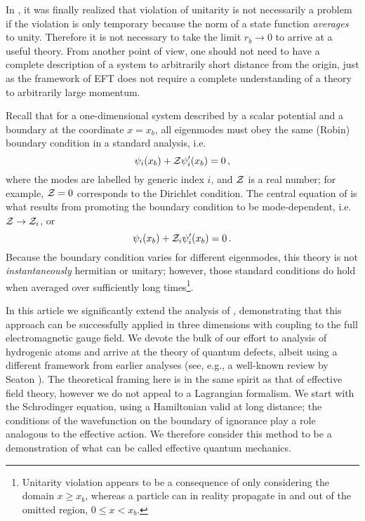 \documentclass[pra,twocolumn,nofootinbib, superscriptaddress]{revtex4}%
\begin{document}
In \cite{Jacobs:2019woc}, it was finally realized that violation of unitarity is not necessarily a problem if the violation is only temporary because the norm of a state function \emph{averages} to unity. Therefore it is not necessary to take the limit $r_b\to 0$ to arrive at a useful theory. From another point of view, one should not need to have a complete description of a system to arbitrarily short distance from the origin, just as the framework of EFT does not require a complete understanding of a theory to arbitrarily large momentum.

  Recall that for a one-dimensional system described by a scalar potential and a boundary at the coordinate $x=x_b$, all eigenmodes must obey the same (Robin) boundary condition in a standard analysis, i.e.
\begin{equation}
\psi_i(x_b)+{\cal Z} \psi_i'(x_b)=0\,,
\end{equation}
where the modes are labelled by generic index $i$, and ${\cal Z}$ is a real number; for example, ${\cal Z}=0$ corresponds to the Dirichlet condition.  The central equation of \cite{Jacobs:2019woc} is what results from promoting the boundary condition to be mode-dependent, i.e. ${\cal Z}\to {\cal Z}_i$, or
\begin{equation}\label{1d_EQM_bc}
\psi_i(x_b)+{\cal Z}_i \psi_i'(x_b)=0\,.
\end{equation}
Because the boundary condition varies for different eigenmodes, this theory is not \emph{instantaneously} hermitian or unitary; however, those standard conditions do hold when averaged over sufficiently long times\footnote{Unitarity violation appears to be a consequence of only considering the domain $x\geq x_b$, whereas a particle can in reality propagate in and out of the omitted region, $0\leq x <x_b$.}.   

In this article we significantly extend the analysis of \cite{Jacobs:2019woc}, demonstrating that this approach can be successfully applied in three dimensions with coupling to the full electromagnetic gauge field. We devote the bulk of our effort to analysis of hydrogenic atoms and arrive at the theory of quantum defects, albeit using a different framework from earlier analyses (see, e.g., a well-known review by Seaton \cite{Seaton_1983}).  The theoretical framing here is in the same spirit as that of effective field theory, however we do not appeal to a Lagrangian formalism. We start with the Schrodinger equation, using a Hamiltonian valid at long distance; the conditions of the wavefunction on the boundary of ignorance play a role analogous to the effective action. We therefore consider this method to be a demonstration of what can be called effective quantum mechanics. 
\end{document}
